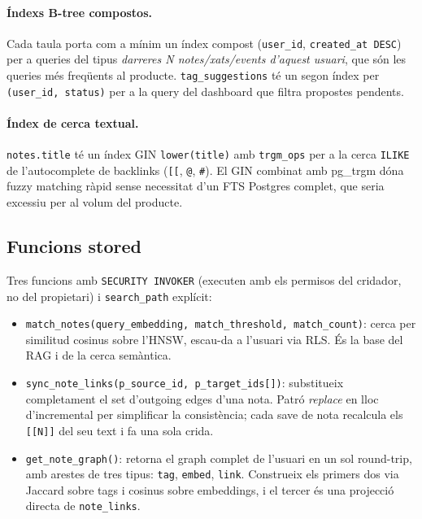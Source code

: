 \paragraph{Índexs B-tree compostos.} Cada taula porta com a mínim un índex compost (\texttt{user\_id}, \texttt{created\_at DESC}) per a queries del tipus \emph{darreres N notes/xats/events d'aquest usuari}, que són les queries més freqüents al producte. \texttt{tag\_suggestions} té un segon índex per \texttt{(user\_id, status)} per a la query del dashboard que filtra propostes pendents.

\paragraph{Índex de cerca textual.} \texttt{notes.title} té un índex GIN \texttt{lower(title)} amb \texttt{trgm\_ops} per a la cerca \texttt{ILIKE} de l'autocomplete de backlinks (\texttt{[[}, \texttt{@}, \texttt{\#}). El GIN combinat amb pg\_trgm dóna fuzzy matching ràpid sense necessitat d'un FTS Postgres complet, que seria excessiu per al volum del producte.

\subsection{Funcions stored}

Tres funcions amb \texttt{SECURITY INVOKER} (executen amb els permisos del cridador, no del propietari) i \texttt{search\_path} explícit:

\begin{itemize}
    \item \texttt{match\_notes(query\_embedding, match\_threshold, match\_count)}: cerca per similitud cosinus sobre l'HNSW, escau-da a l'usuari via RLS. És la base del RAG i de la cerca semàntica.
    \item \texttt{sync\_note\_links(p\_source\_id, p\_target\_ids[])}: substitueix completament el set d'outgoing edges d'una nota. Patró \emph{replace} en lloc d'incremental per simplificar la consistència; cada save de nota recalcula els \texttt{[[N]]} del seu text i fa una sola crida.
    \item \texttt{get\_note\_graph()}: retorna el graph complet de l'usuari en un sol round-trip, amb arestes de tres tipus: \texttt{tag}, \texttt{embed}, \texttt{link}. Construeix els primers dos via Jaccard sobre tags i cosinus sobre embeddings, i el tercer és una projecció directa de \texttt{note\_links}.
\end{itemize}

